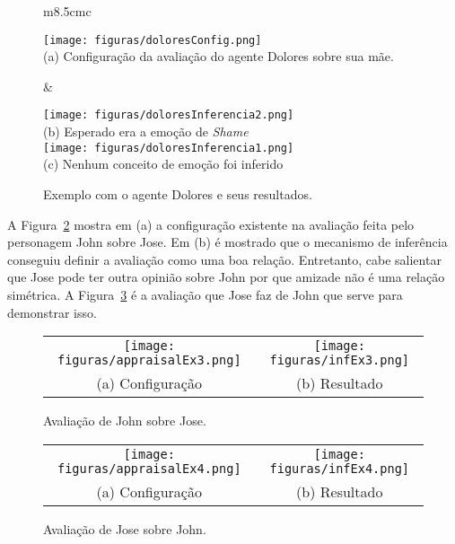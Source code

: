 \begin{figure}[ht]
    \centering
	\begin{minipage}{1.0\linewidth}
	  \centering
	  \begin{tabular}{m{8.5cm}c}
	    \begin{minipage}{\linewidth}
			\centering
			\texttt{[image: figuras/doloresConfig.png]} \\
			(a) Configuração da avaliação do agente Dolores sobre sua mãe.
		\end{minipage} &
	    \begin{minipage}{0.40\linewidth}
			\centering
			\texttt{[image: figuras/doloresInferencia2.png]} \\
				(b) Esperado era a emoção de \emph{Shame} \vspace{0.5cm}\\
			\texttt{[image: figuras/doloresInferencia1.png]} \\
				(c) Nenhum conceito de emoção foi inferido
		\end{minipage}
	  \end{tabular}
	\end{minipage}
	\caption{Exemplo com o agente Dolores e seus resultados.}
	\label{fig:tp:cdu:shameOtherDontSupported}
\end{figure}


A Figura~\ref{fig:tp:cdu:johnHasFriendJose} mostra em (a) a configuração
existente na avaliação feita pelo personagem John sobre Jose. Em (b) é
mostrado que o mecanismo de inferência conseguiu definir a avaliação como uma
boa relação. Entretanto, cabe salientar que Jose pode ter outra opinião sobre
John por que amizade não é uma relação simétrica. A
Figura~\ref{fig:tp:cdu:joseHasEnemyJohn} é a avaliação que Jose faz de John
que serve para demonstrar isso. %

\begin{figure}[ht]
  \centering
  \begin{tabular}{cc}
  \texttt{[image: figuras/appraisalEx3.png]} & \texttt{[image: figuras/infEx3.png]} \\
  (a) Configuração & (b) Resultado
  \end{tabular}
  \caption{Avaliação de John sobre Jose.}
  \label{fig:tp:cdu:johnHasFriendJose}
\end{figure}

\begin{figure}[ht]
  \centering
  \begin{tabular}{cc}
  \texttt{[image: figuras/appraisalEx4.png]} & \texttt{[image: figuras/infEx4.png]} \\
  (a) Configuração & (b) Resultado
  \end{tabular}
  \caption{Avaliação de Jose sobre John.}
  \label{fig:tp:cdu:joseHasEnemyJohn}
\end{figure}

